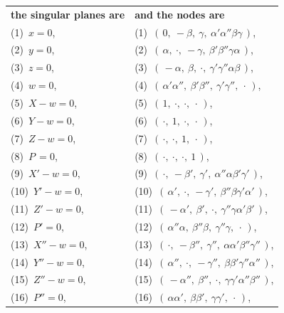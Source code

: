 \documentclass[11pt,a4paper]{article}
\begin{document}
\begin{tabular}{ll}
\textbf{the singular planes are} & \textbf{and the nodes are}\\
(1)\ $x = 0$,                       & (1)\ $(\,0,\ -\beta,\ \gamma,\ \alpha'\alpha''\beta\gamma\,)$, \\
(2)\ $y = 0$,                       & (2)\ $(\,\alpha,\ \cdot,\ -\gamma,\ \beta'\beta''\gamma\alpha\,)$, \\
(3)\ $z = 0$,                       & (3)\ $(\,-\alpha,\ \beta,\ \cdot,\ \gamma'\gamma''\alpha\beta\,)$, \\
(4)\ $w = 0$,                       & (4)\ $(\,\alpha'\alpha'',\ \beta'\beta'',\ \gamma'\gamma'',\ \cdot\,)$, \\
(5)\ $X - w = 0$,                   & (5)\ $(\,1,\ \cdot,\ \cdot,\ \cdot\,)$, \\
(6)\ $Y - w = 0$,                   & (6)\ $(\,\cdot,\ 1,\ \cdot,\ \cdot\,)$, \\
(7)\ $Z - w = 0$,                   & (7)\ $(\,\cdot,\ \cdot,\ 1,\ \cdot\,)$, \\
(8)\ $P\,= 0$,                      & (8)\ $(\,\cdot,\ \cdot,\ \cdot,\ 1\,)$, \\
(9)\ $X' - w = 0$,                  & (9)\ $(\,\cdot,\ -\beta',\ \gamma',\ \alpha''\alpha\beta'\gamma'\,)$, \\
(10)\ $Y' - w = 0$,                 & (10)\ $(\,\alpha',\ \cdot,\ -\gamma',\ \beta''\beta\gamma'\alpha'\,)$, \\
(11)\ $Z' - w = 0$,                 & (11)\ $(\,-\alpha',\ \beta',\ \cdot,\ \gamma''\gamma\alpha'\beta'\,)$, \\
(12)\ $P' = 0$,                     & (12)\ $(\,\alpha''\alpha,\ \beta''\beta,\ \gamma''\gamma,\ \cdot\,)$, \\
(13)\ $X'' - w = 0$,                & (13)\ $(\,\cdot,\ -\beta'',\ \gamma'',\ \alpha\alpha'\beta''\gamma''\,)$, \\
(14)\ $Y'' - w = 0$,                & (14)\ $(\,\alpha'',\ \cdot,\ -\gamma'',\ \beta\beta'\gamma''\alpha''\,)$, \\
(15)\ $Z'' - w = 0$,                & (15)\ $(\,-\alpha'',\ \beta'',\ \cdot,\ \gamma\gamma'\alpha''\beta''\,)$, \\
(16)\ $P'' = 0$,                    & (16)\ $(\,\alpha\alpha',\ \beta\beta',\ \gamma\gamma',\ \cdot\,)$,
\end{tabular}

\medskip
\end{document}
